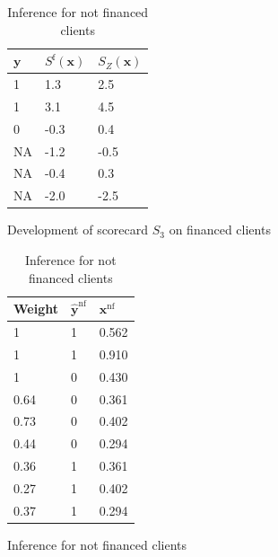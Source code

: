\begin{table}
{\begin{multicols}{4}
\begin{subfigure}[t]{0.22\textwidth}
\begin{center}
\begin{adjustbox}{max width=0.95\textwidth}
\begin{tabular}{l l l}
\toprule
\textbf{${\bm{y}}$} & \textbf{$S^{\text{f}}({\bm{x}})$} & \textbf{$S_Z({\bm{x}})$}\\
\midrule
1 & 1.3 & 2.5\\
1 & 3.1 & 4.5 \\
0 & -0.3 & 0.4 \\
NA & -1.2 & -0.5 \\
NA & -0.4 & 0.3 \\
NA & -2.0 & -2.5 \\
\bottomrule
\end{tabular}
\end{adjustbox}
\end{center}

\caption{Development of scorecard $S_3$ on financed clients}
\label{twins:sfig3}
\end{subfigure}

\columnbreak

\begin{subfigure}[t]{0.22\textwidth}
\begin{center}
\begin{adjustbox}{max width=0.95\textwidth}
\begin{tabular}{l l l}
\toprule
\textbf{Weight} & \textbf{$\hat{\bm{y}}^{\text{nf}}$} & \textbf{${\bm{x}}^{\text{nf}}$}\\
\midrule
1 & 1 & 0.562 \\
1 & 1 & 0.910 \\
1 & 0 & 0.430 \\
0.64 & 0 & 0.361 \\
0.73 & 0 & 0.402 \\
0.44 & 0 & 0.294 \\
0.36 & 1 & 0.361 \\
0.27 & 1 & 0.402 \\
0.37 & 1 & 0.294 \\
\bottomrule
\end{tabular}
\end{adjustbox}
\end{center}

\caption{Inference for not financed clients}
\label{twins:sfig4}
\end{subfigure}

\end{multicols}
}
\end{table}


